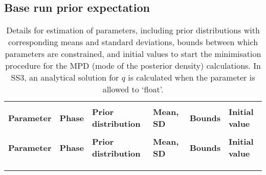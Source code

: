 \documentclass[11pt]{book}
\def\bfTh{{\bf \Theta}}%
\newcommand{\comment}[1]{}                    %
\def\bfTh{{\bf \Theta}}%
\newcommand{\eref}[1]{(\ref{#1})}
\begin{document}
\subsection{Base run prior expectation}

\begin{longtable}{L{1.3in}C{0.8in}C{1.0in}C{1.4in}C{0.9in}C{1.0in}}
\caption{Details for estimation of parameters, including prior distributions with corresponding means and standard deviations, bounds between which parameters are constrained, and initial values to start the minimisation procedure for the MPD (mode of the posterior density) calculations. In SS3, an analytical solution for $q$ is calculated when the parameter is allowed to `float'.}
\label{tab:priors}
\\ \hline\\[-2.2ex]
\textbf{Parameter} & \textbf{Phase} & \textbf{Prior distribution} & \textbf{Mean, SD} & \textbf{Bounds} & \textbf{Initial value}
\\[0.2ex]\hline\\[-1.5ex] \endfirsthead \hline 
\textbf{Parameter} & \textbf{Phase} & \textbf{Prior distribution} & \textbf{Mean, SD} & \textbf{Bounds} & \textbf{Initial value}
\\[0.2ex]\hline\\[-1.5ex] \endhead
\hline\\[-2.2ex]   \endfoot  \hline \endlastfoot  %


\end{longtable}
\end{document}

